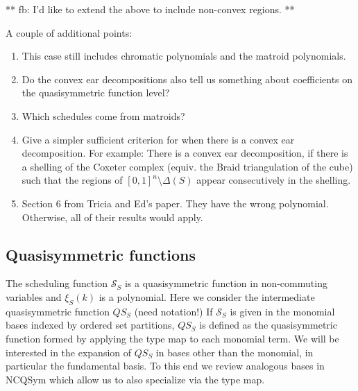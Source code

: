 \documentclass[12pt,reqno]{amsart}
\numberwithin{definition}{section}
\newcommand{\SSS}{\mathcal{S}}
\newcommand{\defn}[1]{\emph{#1}}
\begin{document}
** fb: I'd like to extend the above to include non-convex regions. **

A couple of additional points:
\begin{enumerate} 
\item This case still includes chromatic polynomials and the matroid polynomials.
\item Do the convex ear decompositions also tell us something about coefficients on the quasisymmetric function level?
\item Which schedules come from matroids? 
\item Give a simpler sufficient criterion for when there is a convex ear decomposition. For example: There is a convex ear decomposition, if there is a shelling of the Coxeter complex (equiv. the Braid triangulation of the cube) such that the regions of $[0,1]^n\setminus\Delta(S)$ appear consecutively in the shelling.
\item Section 6 from Tricia and Ed's paper.  They have the wrong polynomial.  Otherwise, all of their results would apply.
\end{enumerate}





\subsection{Quasisymmetric functions}

The scheduling function $\SSS_S$ is a quasisymmetric function in
non-commuting variables and $\xi_S(k)$ is a polynomial.  Here we
consider the intermediate quasisymmetric function $QS_S$ (need
notation!)  If $\SSS_S$ is given in the monomial bases indexed by
ordered set partitions, $QS_S$ is defined as the quasisymmetric
function formed by applying the type map to each monomial term.  We
will be interested in the expansion of $QS_S$ in bases other than the
monomial, in particular the fundamental basis.  To this end we review
analogous bases in NCQSym which allow us to also specialize via the
type map.
\end{document}
